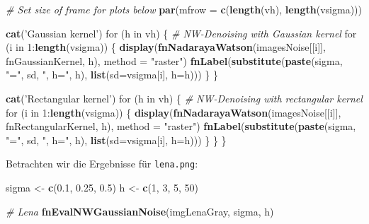 \documentclass[10pt,]{article}
\newenvironment{Shaded}{\begin{snugshade}}{\end{snugshade}}
\newcommand{\KeywordTok}[1]{\textcolor[rgb]{0.13,0.29,0.53}{\textbf{{#1}}}}
\newcommand{\DataTypeTok}[1]{\textcolor[rgb]{0.13,0.29,0.53}{{#1}}}
\newcommand{\DecValTok}[1]{\textcolor[rgb]{0.00,0.00,0.81}{{#1}}}
\newcommand{\FloatTok}[1]{\textcolor[rgb]{0.00,0.00,0.81}{{#1}}}
\newcommand{\StringTok}[1]{\textcolor[rgb]{0.31,0.60,0.02}{{#1}}}
\newcommand{\CommentTok}[1]{\textcolor[rgb]{0.56,0.35,0.01}{\textit{{#1}}}}
\newcommand{\NormalTok}[1]{{#1}}
\begin{document}
\begin{Shaded}
\begin{Highlighting}[]
  \CommentTok{# Set size of frame for plots below}
  \KeywordTok{par}\NormalTok{(}\DataTypeTok{mfrow =} \KeywordTok{c}\NormalTok{(}\KeywordTok{length}\NormalTok{(vh), }\KeywordTok{length}\NormalTok{(vsigma)))}
  
  \KeywordTok{cat}\NormalTok{(}\StringTok{'Gaussian kernel'}\NormalTok{)}
  \NormalTok{for (h in vh) \{}
    \CommentTok{# NW-Denoising with Gaussian kernel}
    \NormalTok{for (i in }\DecValTok{1}\NormalTok{:}\KeywordTok{length}\NormalTok{(vsigma)) \{}
      \KeywordTok{display}\NormalTok{(}\KeywordTok{fnNadarayaWatson}\NormalTok{(imagesNoise[[i]], fnGaussianKernel, h),}
              \DataTypeTok{method =} \StringTok{"raster"}\NormalTok{)}
      \KeywordTok{fnLabel}\NormalTok{(}\KeywordTok{substitute}\NormalTok{(}\KeywordTok{paste}\NormalTok{(sigma, }\StringTok{"="}\NormalTok{, sd, }\StringTok{", h="}\NormalTok{, h),}
                         \KeywordTok{list}\NormalTok{(}\DataTypeTok{sd=}\NormalTok{vsigma[i], }\DataTypeTok{h=}\NormalTok{h)))}
    \NormalTok{\}}
  \NormalTok{\}}
  
  \KeywordTok{cat}\NormalTok{(}\StringTok{'Rectangular kernel'}\NormalTok{)}
  \NormalTok{for (h in vh) \{ }
    \CommentTok{# NW-Denoising with rectangular kernel}
    \NormalTok{for (i in }\DecValTok{1}\NormalTok{:}\KeywordTok{length}\NormalTok{(vsigma)) \{}
      \KeywordTok{display}\NormalTok{(}\KeywordTok{fnNadarayaWatson}\NormalTok{(imagesNoise[[i]], fnRectangularKernel, h), }
              \DataTypeTok{method =} \StringTok{"raster"}\NormalTok{)}
      \KeywordTok{fnLabel}\NormalTok{(}\KeywordTok{substitute}\NormalTok{(}\KeywordTok{paste}\NormalTok{(sigma, }\StringTok{"="}\NormalTok{, sd, }\StringTok{", h="}\NormalTok{, h),}
                         \KeywordTok{list}\NormalTok{(}\DataTypeTok{sd=}\NormalTok{vsigma[i], }\DataTypeTok{h=}\NormalTok{h)))}
    \NormalTok{\}}
  \NormalTok{\}}
\NormalTok{\}}
\end{Highlighting}
\end{Shaded}

Betrachten wir die Ergebnisse für \texttt{lena.png}:

\begin{Shaded}
\begin{Highlighting}[]
\NormalTok{sigma <-}\StringTok{ }\KeywordTok{c}\NormalTok{(}\FloatTok{0.1}\NormalTok{, }\FloatTok{0.25}\NormalTok{, }\FloatTok{0.5}\NormalTok{)}
\NormalTok{h <-}\StringTok{ }\KeywordTok{c}\NormalTok{(}\DecValTok{1}\NormalTok{, }\DecValTok{3}\NormalTok{, }\DecValTok{5}\NormalTok{, }\DecValTok{50}\NormalTok{)}

\CommentTok{# Lena}
\KeywordTok{fnEvalNWGaussianNoise}\NormalTok{(imgLenaGray, sigma, h)}
\end{Highlighting}
\end{Shaded}
\end{document}
